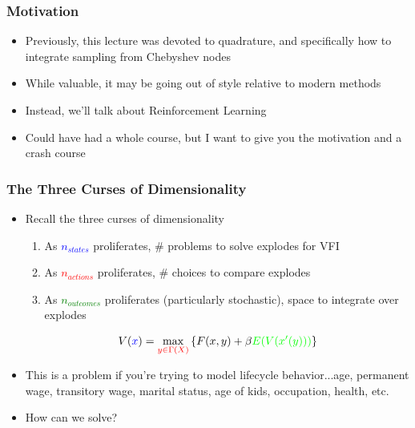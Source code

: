 \documentclass{beamer}
\author{Trevor S. Gallen}
\date{}
\begin{document}
\begin{frame}
\titlepage
\end{frame}

\begin{frame}
\frametitle[alignment=center]{Motivation}
\begin{itemize}
\item Previously, this lecture was devoted to quadrature, and specifically how to integrate sampling from Chebyshev nodes
\bigskip
\item While valuable, it may be going out of style relative to modern methods
\bigskip
\item Instead, we'll talk about Reinforcement Learning
\bigskip
\item Could have had a whole course, but I want to give you the motivation and a crash course
\end{itemize}
\end{frame}


\begin{frame}
\frametitle[alignment=center]{The Three Curses of Dimensionality}
\begin{itemize}
\item Recall the three curses of dimensionality
\begin{enumerate}
\item As \textcolor{blue}{$n_{states}$} proliferates, \# problems to solve explodes for VFI
\item As \textcolor{red}{$n_{actions}$} proliferates, \# choices to compare explodes
\item As \textcolor{green}{$n_{outcomes}$} proliferates (particularly stochastic), space to integrate over explodes
\end{enumerate}
$$V(\textcolor{blue}{x})=\max_{\textcolor{red}{y\in\Gamma(X)}}\left\{F(x,y)+\beta \textcolor{green}{E(V(x'(y)))}\right\}$$
\item This is a problem if you're trying to model lifecycle behavior...age, permanent wage, transitory wage, marital status, age of kids, occupation, health, etc.
\bigskip
\item How can we solve?
\end{itemize}
\end{frame}
\end{document}
